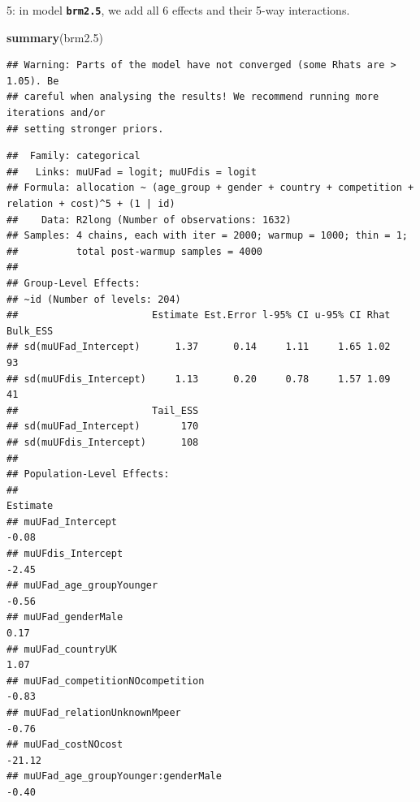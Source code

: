 \documentclass[
]{article}
\newenvironment{Shaded}{\begin{snugshade}}{\end{snugshade}}
\newcommand{\FloatTok}[1]{\textcolor[rgb]{0.00,0.00,0.81}{#1}}
\newcommand{\KeywordTok}[1]{\textcolor[rgb]{0.13,0.29,0.53}{\textbf{#1}}}
\newcommand{\NormalTok}[1]{#1}
\begin{document}
5: in model \textbf{\texttt{brm2.5}}, we add all 6 effects and their
5-way interactions.

\begin{Shaded}
\begin{Highlighting}[]
\KeywordTok{summary}\NormalTok{(brm2}\FloatTok{.5}\NormalTok{)}
\end{Highlighting}
\end{Shaded}

\begin{verbatim}
## Warning: Parts of the model have not converged (some Rhats are > 1.05). Be
## careful when analysing the results! We recommend running more iterations and/or
## setting stronger priors.
\end{verbatim}

\begin{verbatim}
##  Family: categorical 
##   Links: muUFad = logit; muUFdis = logit 
## Formula: allocation ~ (age_group + gender + country + competition + relation + cost)^5 + (1 | id) 
##    Data: R2long (Number of observations: 1632) 
## Samples: 4 chains, each with iter = 2000; warmup = 1000; thin = 1;
##          total post-warmup samples = 4000
## 
## Group-Level Effects: 
## ~id (Number of levels: 204) 
##                       Estimate Est.Error l-95% CI u-95% CI Rhat Bulk_ESS
## sd(muUFad_Intercept)      1.37      0.14     1.11     1.65 1.02       93
## sd(muUFdis_Intercept)     1.13      0.20     0.78     1.57 1.09       41
##                       Tail_ESS
## sd(muUFad_Intercept)       170
## sd(muUFdis_Intercept)      108
## 
## Population-Level Effects: 
##                                                                                              Estimate
## muUFad_Intercept                                                                                -0.08
## muUFdis_Intercept                                                                               -2.45
## muUFad_age_groupYounger                                                                         -0.56
## muUFad_genderMale                                                                                0.17
## muUFad_countryUK                                                                                 1.07
## muUFad_competitionNOcompetition                                                                 -0.83
## muUFad_relationUnknownMpeer                                                                     -0.76
## muUFad_costNOcost                                                                              -21.12
## muUFad_age_groupYounger:genderMale                                                              -0.40

\end{verbatim}
\end{document}
